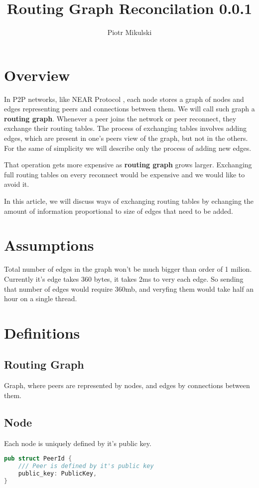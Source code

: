 \documentclass[11pt]{article}
\title{\textbf{Routing Graph Reconcilation 0.0.1}}
\author{Piotr Mikulski}
\date{}
\begin{document}
\maketitle
\thispagestyle{empty}

\section{Overview}
In P2P networks, like NEAR Protocol \cite{near}, each node stores a graph of nodes and edges representing peers and connections between them.
We will call such graph a \textbf{routing graph}. 
Whenever a peer joins the network or peer reconnect, they exchange their routing tables. 
The process of exchanging tables involves adding edges, which are present in one's peers view of the graph, but not in the others.
For the same of simplicity we will describe only the process of adding new edges.

That operation gets more expensive as \textbf{routing graph} grows larger. 
Exchanging full routing tables on every reconnect would be expensive and we would like to avoid it.

In this article, we will discuss ways of exchanging routing tables by echanging the amount of information proportional to size of edges that need to be added.

\section{Assumptions}
Total number of edges in the graph won't be much bigger than order of 1 milion. Currently it's edge takes 360 bytes, it takes 2ms to very each edge.
So sending that number of edges would require 360mb, and veryfing them would take half an hour on a single thread.

\section{Definitions}
\subsection{Routing Graph}
Graph, where peers are represented by nodes, and edges by connections between them.
\subsection{Node}
Each node is uniquely defined by it's public key.
\begin{lstlisting}[language=Rust]
pub struct PeerId {
    /// Peer is defined by it's public key
    public_key: PublicKey,
}
\end{lstlisting}
\end{document}
